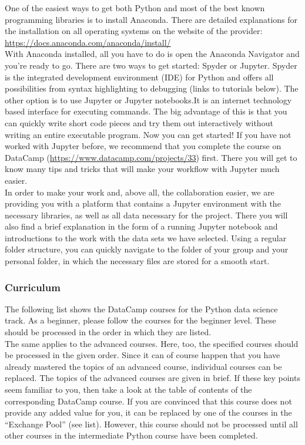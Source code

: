 \documentclass[
  11pt,
]{article}
\begin{document}
One of the easiest ways to get both Python and most of the best known programming libraries is to install Anaconda. There are detailed explanations for the installation on all operating systems on the website of the provider:
\url{https://docs.anaconda.com/anaconda/install/}\\
With Anaconda installed, all you have to do is open the Anaconda Navigator and you're ready to go. There are two ways to get started: Spyder or Jupyter. Spyder is the integrated development environment (IDE) for Python and offers all possibilities from syntax highlighting to debugging (links to tutorials below). The other option is to use Jupyter or Jupyter notebooks.It is an internet technology based interface for executing commands. The big advantage of this is that you can quickly write short code pieces and try them out interactively without writing an entire executable program.
Now you can get started! If you have not worked with Jupyter before, we recommend that you complete the course on DataCamp (\url{https://www.datacamp.com/projects/33}) first. There you will get to know many tips and tricks that will make your workflow with Jupyter much easier.\\
In order to make your work and, above all, the collaboration easier, we are providing you with a platform that contains a Jupyter environment with the necessary libraries, as well as all data necessary for the project. There you will also find a brief explanation in the form of a running Jupyter notebook and introductions to the work with the data sets we have selected. Using a regular folder structure, you can quickly navigate to the folder of your group and your personal folder, in which the necessary files are stored for a smooth start.

\hypertarget{curriculum-1}{%
\subsubsection{Curriculum}\label{curriculum-1}}

The following list shows the DataCamp courses for the Python data science track. As a beginner, please follow the courses for the beginner level. These should be processed in the order in which they are listed.\\
The same applies to the advanced courses. Here, too, the specified courses should be processed in the given order. Since it can of course happen that you have already mastered the topics of an advanced course, individual courses can be replaced. The topics of the advanced courses are given in brief. If these key points seem familiar to you, then take a look at the table of contents of the corresponding DataCamp course.
If you are convinced that this course does not provide any added value for you, it can be replaced by one of the courses in the ``Exchange Pool'' (see list). However, this course should not be processed until all other courses in the intermediate Python course have been completed.
\end{document}
